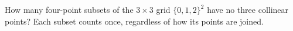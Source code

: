 How many four-point subsets of the $3\times3$ grid $\{0,1,2\}^2$ have no three collinear points? Each subset counts once, regardless of how its points are joined.
